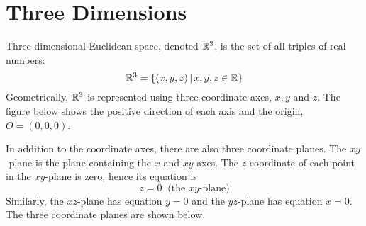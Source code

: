 \documentclass[handout]{ximera}
\begin{document}
\section{Three Dimensions}
Three dimensional Euclidean space, denoted $\mathbb R^3$, is the set of all triples of real numbers:
\[
\mathbb R^3 = \{(x,y,z)\,|\, x,y,z \in \mathbb R \}
\]
Geometrically, $\mathbb R^3$ is represented using three coordinate axes, $x, y$ and $z$.
The figure below shows the positive direction of each axis and the origin, $O = (0,0,0)$.
\begin{image}
\end{image}
In addition to the coordinate axes, there are also three coordinate planes.  
The $xy$-plane is the plane containing the $x$ and $xy$ axes.  
The $z$-coordinate of each point in the $xy$-plane is zero, hence its equation is
\[
z = 0 \;\; \text{(the $xy$-plane)}
\]
Similarly, the $xz$-plane has equation $y = 0$ and the $yz$-plane has equation $x=0$.
The three coordinate planes are shown below.
\begin{image}
\end{image}
\end{document}
